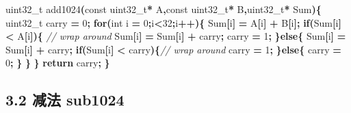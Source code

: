 \documentclass[11pt,a4paper]{ctexart}
\newenvironment{Shaded}{\begin{snugshade}}{\end{snugshade}}
\newcommand{\CommentTok}[1]{\textcolor[rgb]{0.56,0.35,0.01}{\textit{#1}}}
\newcommand{\ControlFlowTok}[1]{\textcolor[rgb]{0.13,0.29,0.53}{\textbf{#1}}}
\newcommand{\DataTypeTok}[1]{\textcolor[rgb]{0.13,0.29,0.53}{#1}}
\newcommand{\DecValTok}[1]{\textcolor[rgb]{0.00,0.00,0.81}{#1}}
\newcommand{\NormalTok}[1]{#1}
\newcommand{\OperatorTok}[1]{\textcolor[rgb]{0.81,0.36,0.00}{\textbf{#1}}}
\renewenvironment{Shaded}{\begin{snugshade}}{\end{snugshade}}
\begin{document}
\begin{Shaded}
\begin{Highlighting}[]
\DataTypeTok{uint32\_t}\NormalTok{ add1024}\OperatorTok{(}\DataTypeTok{const} \DataTypeTok{uint32\_t}\OperatorTok{*}\NormalTok{ A}\OperatorTok{,}\DataTypeTok{const} \DataTypeTok{uint32\_t}\OperatorTok{*}\NormalTok{ B}\OperatorTok{,}\DataTypeTok{uint32\_t}\OperatorTok{*}\NormalTok{ Sum}\OperatorTok{)\{}
    \DataTypeTok{uint32\_t}\NormalTok{ carry }\OperatorTok{=} \DecValTok{0}\OperatorTok{;}
    \ControlFlowTok{for}\OperatorTok{(}\DataTypeTok{int}\NormalTok{ i }\OperatorTok{=} \DecValTok{0}\OperatorTok{;}\NormalTok{i}\OperatorTok{\textless{}}\DecValTok{32}\OperatorTok{;}\NormalTok{i}\OperatorTok{++)\{}
\NormalTok{        Sum}\OperatorTok{[}\NormalTok{i}\OperatorTok{]} \OperatorTok{=}\NormalTok{ A}\OperatorTok{[}\NormalTok{i}\OperatorTok{]} \OperatorTok{+}\NormalTok{ B}\OperatorTok{[}\NormalTok{i}\OperatorTok{];}
        \ControlFlowTok{if}\OperatorTok{(}\NormalTok{Sum}\OperatorTok{[}\NormalTok{i}\OperatorTok{]} \OperatorTok{\textless{}}\NormalTok{ A}\OperatorTok{[}\NormalTok{i}\OperatorTok{])\{} \CommentTok{// wrap around}
\NormalTok{            Sum}\OperatorTok{[}\NormalTok{i}\OperatorTok{]} \OperatorTok{=}\NormalTok{ Sum}\OperatorTok{[}\NormalTok{i}\OperatorTok{]} \OperatorTok{+}\NormalTok{ carry}\OperatorTok{;}
\NormalTok{            carry }\OperatorTok{=} \DecValTok{1}\OperatorTok{;}
        \OperatorTok{\}}\ControlFlowTok{else}\OperatorTok{\{}
\NormalTok{            Sum}\OperatorTok{[}\NormalTok{i}\OperatorTok{]} \OperatorTok{=}\NormalTok{ Sum}\OperatorTok{[}\NormalTok{i}\OperatorTok{]} \OperatorTok{+}\NormalTok{ carry}\OperatorTok{;}
            \ControlFlowTok{if}\OperatorTok{(}\NormalTok{Sum}\OperatorTok{[}\NormalTok{i}\OperatorTok{]} \OperatorTok{\textless{}}\NormalTok{ carry}\OperatorTok{)\{}\CommentTok{// wrap around}
\NormalTok{                carry }\OperatorTok{=} \DecValTok{1}\OperatorTok{;}
            \OperatorTok{\}}\ControlFlowTok{else}\OperatorTok{\{}
\NormalTok{                carry }\OperatorTok{=} \DecValTok{0}\OperatorTok{;}
            \OperatorTok{\}}
        \OperatorTok{\}}
    \OperatorTok{\}}
    \ControlFlowTok{return}\NormalTok{ carry}\OperatorTok{;}
\OperatorTok{\}}
\end{Highlighting}
\end{Shaded}

\FloatBarrier

\hypertarget{ux51cfux6cd5-sub1024}{%
\subsection{3.2 减法 sub1024}\label{ux51cfux6cd5-sub1024}}
\end{document}
